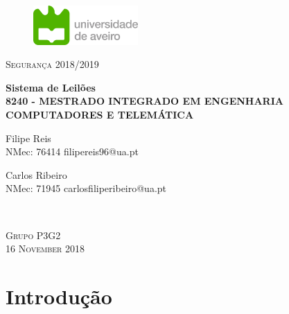 \documentclass[pdftex,12pt,a4paper]{report}
\begin{document}
\begin{figure}[h]
\center
\includegraphics[height=1.5cm]{logo_UA.png}
\end{figure}
\begin{center}


\textsc{\large Segurança 2018/2019\\[2cm]}

{ \huge \bfseries Sistema de Leilões \\[4cm]

\textsc{\small{8240 - MESTRADO INTEGRADO EM ENGENHARIA COMPUTADORES E TELEMÁTICA}}\\[2cm]
}
\end{center}

\begin{minipage}{0.4\textwidth}

\begin{flushleft} \large
Filipe Reis
\small{\\NMec: 76414}
\small{filipereis96@ua.pt}
\end{flushleft}
\end{minipage}
\begin{minipage}{0.4\textwidth}

\begin{flushright} \large
Carlos Ribeiro
\small{\\NMec: 71945}
\small{carlosfiliperibeiro@ua.pt}
\end{flushright}
\end{minipage}\\[1cm]

\vfill

\begin{center}
\textsc{ Grupo P3G2\\[1cm]}
\textsc{\large 16 November 2018\\[2cm]}
\end{center}




\renewcommand*\contentsname{Conteúdos}
\tableofcontents

\renewcommand{\thechapter}{}

\clearpage

\section{Introdução}
\end{document}
